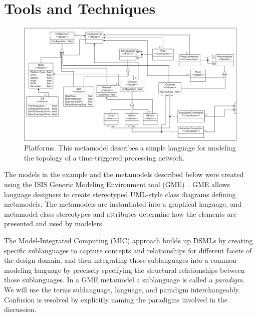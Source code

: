 \section{Tools and Techniques}

\begin{figure}
	\centering
	\includegraphics[width=\columnwidth]{figures/platform.png}
	\caption{Platforms. This metamodel describes a simple 
language for modeling the topology of a time-triggered processing 
network.}
	\label{fig:platform}
\end{figure}

The models in the example and the metamodels described below 
were created using the ISIS Generic Modeling Environment 
tool (GME)~\cite{mic:gme}.  GME allows language designers to create 
stereotyped UML-style class diagrams defining metamodels.  
The metamodels are instantiated into a graphical language, 
and metamodel class stereotypes and attributes determine how 
the elements are presented and used by modelers. 

The Model-Integrated Computing (MIC) approach\cite{mic:overview} 
builds up DSMLs by creating specific sublanguages to 
capture concepts and relationships for different facets of the
design domain, and then integrating those sublanguages into 
a common modeling language by precisely specifying the 
structural relationships between those sublanguages.  In a GME
metamodel a sublanguage is called a \emph{paradigm}.  We will
use the terms sublanguage, language, and paradigm interchangeably.
Confusion is resolved by explicitly naming the paradigms involved
in the discussion.

